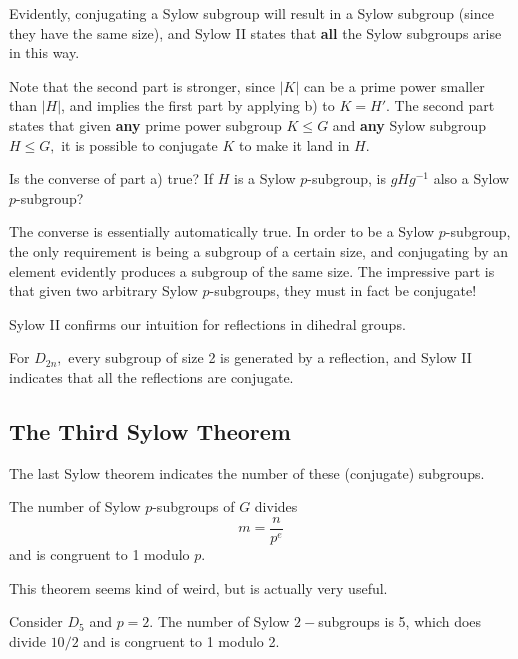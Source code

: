 Evidently, conjugating a Sylow subgroup will result in a Sylow subgroup (since they have the same size), and Sylow II states that \textbf{all} the Sylow subgroups arise in this way. 

Note that the second part is stronger, since $|K|$ can be a prime power smaller than $|H|$, and implies the first part by applying b) to $K = H'.$ The second part states that given \textbf{any} prime power subgroup $K \leq G$ and \textbf{any} Sylow subgroup $H \leq G,$ it is possible to conjugate $K$ to make it land in $H.$

\begin{question}
Is the converse of part a) true? If $H$ is a Sylow $p$-subgroup, is $gHg^{-1}$ also a Sylow $p$-subgroup?
\end{question}
\begin{ans}
The converse is essentially automatically true. In order to be a Sylow $p$-subgroup, the only requirement is being a subgroup of a certain size, and conjugating by an element evidently produces a subgroup of the same size. The impressive part is that given two arbitrary Sylow $p$-subgroups, they must in fact be conjugate!
\end{ans}

Sylow II confirms our intuition for reflections in dihedral groups.
\begin{example}
For $D_{2n},$ every subgroup of size 2 is generated by a reflection, and Sylow II indicates that all the reflections are conjugate.
\end{example}

\subsection{The Third Sylow Theorem}

The last Sylow theorem indicates the number of these (conjugate) subgroups.

\begin{theorem}
The number of Sylow $p$-subgroups of $G$ divides \[m = \frac{n}{p^e}\] and is congruent to 1 modulo $p.$
\end{theorem}

This theorem seems kind of weird, but is actually very useful.

\begin{example}
Consider $D_5$ and $p = 2.$ The number of Sylow $2-$subgroups is 5, which does divide $10/2$ and is congruent to 1 modulo 2.
\end{example}

